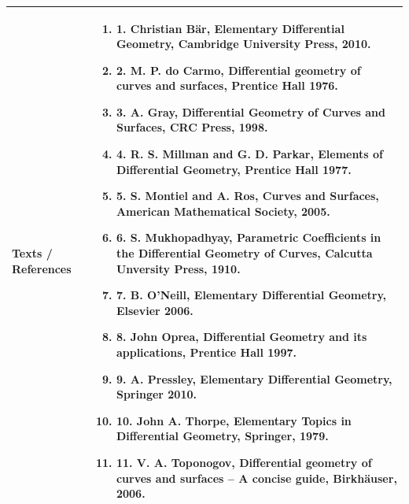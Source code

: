 \documentclass[11pt,a4paper]{article}
\begin{document}
\vspace{8pt}
\renewcommand{\arraystretch}{1.3}
\begin{tabularx}{\textwidth}{|p{3.2cm}|X|}
\hline
\textbf{Texts / References} & \begin{enumerate}[leftmargin=*,noitemsep,topsep=2pt]  \item 1. Christian Bär, Elementary Differential Geometry, Cambridge University Press, 2010.  \item 2. M. P. do Carmo, Differential geometry of curves and surfaces, Prentice Hall 1976.  \item 3. A. Gray, Differential Geometry of Curves and Surfaces, CRC Press, 1998.  \item 4. R. S. Millman and G. D. Parkar, Elements of Differential Geometry, Prentice Hall 1977.  \item 5. S. Montiel and A. Ros, Curves and Surfaces, American Mathematical Society, 2005.  \item 6. S. Mukhopadhyay, Parametric Coefficients in the Differential Geometry of Curves, Calcutta  Unversity Press, 1910.  \item 7. B. O'Neill, Elementary Differential Geometry, Elsevier 2006.  \item 8. John Oprea, Differential Geometry and its applications, Prentice Hall 1997.  \item 9. A. Pressley, Elementary Differential Geometry, Springer 2010.  \item 10. John A. Thorpe, Elementary Topics in Differential Geometry, Springer, 1979.  \item 11. V. A. Toponogov, Differential geometry of curves and surfaces – A concise guide, Birkhäuser,  2006.\end{enumerate} \\
\hline
\end{tabularx}
\clearpage
\end{document}
